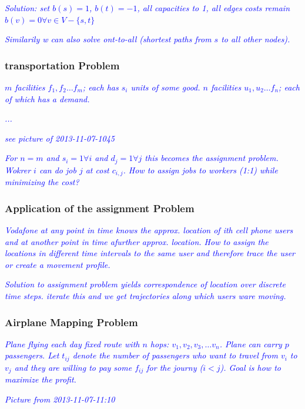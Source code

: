 \documentclass{article}
\begin{document}
\textcolor{blue}{\emph{Solution: set $b(s)=1$, $b(t)=-1$, all capacities to 1, all edges costs remain $b(v)=0  \forall v\in V - \{s,t\}$}}

\textcolor{blue}{\emph{Similarily w can also solve ont-to-all (shortest paths from $s$ to all other nodes).}}

\subsubsection{transportation Problem}

\textcolor{blue}{\emph{$m$ facilities $f_1, f_2 \dots f_m$; each has $s_i$ units of some good. $n$ facilities $u_1, u_2 \dots f_n$; each of which has a demand.}}

\textcolor{blue}{\emph{...}}

\textcolor{blue}{\emph{see picture of 2013-11-07-1045}}

\textcolor{blue}{\emph{For $n=m$ and $s_i =1 \forall i$ and $d_j=1 \forall j$ this becomes the assignment problem. Wokrer $i$ can do job $j$ at cost $c_{i,j}$. How to assign jobs to workers (1:1) while minimizing the cost?}}

\subsubsection{Application of the assignment Problem}
\textcolor{blue}{\emph{Vodafone at any point in time knows the approx. location of ith cell phone users and at another point in time afurther approx. location. How to assign the locations in different time intervals to the same user and therefore trace the user or create a movement profile.}}

\textcolor{blue}{\emph{Solution to assignment problem yields correspondence of location over discrete time steps. iterate this and we get trajectories along which users ware moving.}}

\subsubsection{Airplane Mapping Problem}
\textcolor{blue}{\emph{Plane flying each day fixed route with $n$ hops: $v_1,v_2,v_3, \dots v_n$. Plane can carry $p$ passengers. Let $t_{ij}$ denote the number of passengers who want to travel from $v_i$ to $v_j$ and they are willing to pay some $f_{ij}$ for the journy ($i < j$). Goal is how to maximize the profit.}}

\textcolor{blue}{\emph{Picture from 2013-11-07-11:10}}
\end{document}
